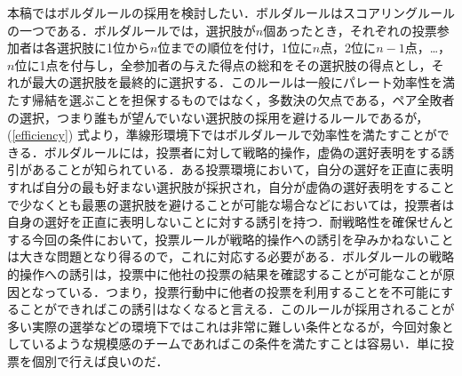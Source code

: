 \documentclass[a4paper, 11pt]{jsarticle}
\begin{document}
本稿ではボルダルールの採用を検討したい．ボルダルールはスコアリングルールの一つである．ボルダルールでは，選択肢が\(n\)個あったとき，それぞれの投票参加者は各選択肢に1位から\(n\)位までの順位を付け，1位に\(n\)点，2位に\(n-1\)点，\dots ，\(n\)位に1点を付与し，全参加者の与えた得点の総和をその選択肢の得点とし，それが最大の選択肢を最終的に選択する．このルールは一般にパレート効率性を満たす帰結を選ぶことを担保するものではなく，多数決の欠点である，ペア全敗者の選択，つまり誰もが望んでいない選択肢の採用を避けるルールであるが， (\ref{efficiency}) 式より，準線形環境下ではボルダルールで効率性を満たすことができる．ボルダルールには，投票者に対して戦略的操作，虚偽の選好表明をする誘引があることが知られている．ある投票環境において，自分の選好を正直に表明すれば自分の最も好まない選択肢が採択され，自分が虚偽の選好表明をすることで少なくとも最悪の選択肢を避けることが可能な場合などにおいては，投票者は自身の選好を正直に表明しないことに対する誘引を持つ．耐戦略性を確保せんとする今回の条件において，投票ルールが戦略的操作への誘引を孕みかねないことは大きな問題となり得るので，これに対応する必要がある．ボルダルールの戦略的操作への誘引は，投票中に他社の投票の結果を確認することが可能なことが原因となっている．つまり，投票行動中に他者の投票を利用することを不可能にすることができればこの誘引はなくなると言える．このルールが採用されることが多い実際の選挙などの環境下ではこれは非常に難しい条件となるが，今回対象としているような規模感のチームであればこの条件を満たすことは容易い．単に投票を個別で行えば良いのだ．
\end{document}
